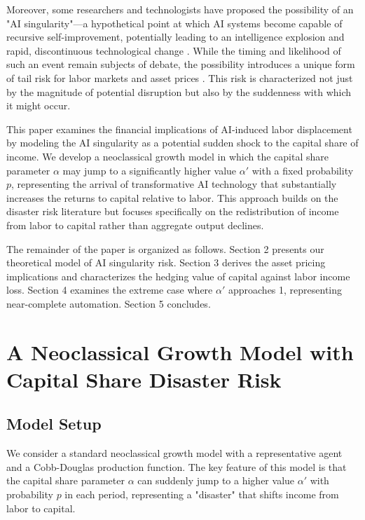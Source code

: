 \documentclass{article}
\theoremstyle{plain}    %
\theoremstyle{definition}  %
\begin{document}
Moreover, some researchers and technologists have proposed the possibility of an "AI singularity"—a hypothetical point at which AI systems become capable of recursive self-improvement, potentially leading to an intelligence explosion and rapid, discontinuous technological change \citep{gofman2024}. While the timing and likelihood of such an event remain subjects of debate, the possibility introduces a unique form of tail risk for labor markets and asset prices \citep{rietz1988, barro2006}. This risk is characterized not just by the magnitude of potential disruption but also by the suddenness with which it might occur.

This paper examines the financial implications of AI-induced labor displacement by modeling the AI singularity as a potential sudden shock to the capital share of income. We develop a neoclassical growth model in which the capital share parameter $\alpha$ may jump to a significantly higher value $\alpha'$ with a fixed probability $p$, representing the arrival of transformative AI technology that substantially increases the returns to capital relative to labor. This approach builds on the disaster risk literature \citep{gourio2013, wachter2013} but focuses specifically on the redistribution of income from labor to capital rather than aggregate output declines.

The remainder of the paper is organized as follows. Section 2 presents our theoretical model of AI singularity risk. Section 3 derives the asset pricing implications and characterizes the hedging value of capital against labor income loss. Section 4 examines the extreme case where $\alpha'$ approaches 1, representing near-complete automation. Section 5 concludes.

\section{A Neoclassical Growth Model with Capital Share Disaster Risk}

\subsection{Model Setup}

We consider a standard neoclassical growth model with a representative agent and a Cobb-Douglas production function. The key feature of this model is that the capital share parameter $\alpha$ can suddenly jump to a higher value $\alpha'$ with probability $p$ in each period, representing a "disaster" that shifts income from labor to capital.
\end{document}
